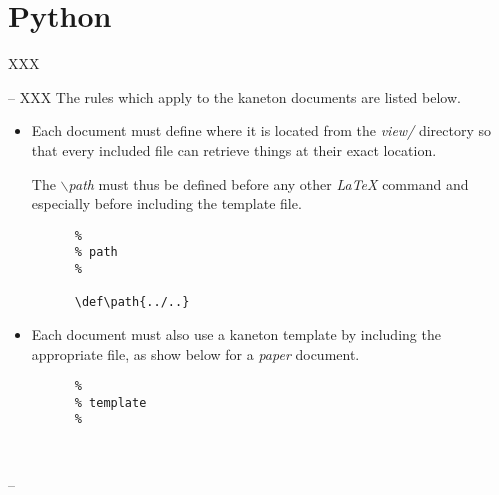 %
%
%
%
%
%

%
%

\section{Python}

XXX

-- XXX
The rules which apply to the kaneton documents are listed below.

\begin{itemize}
  \item
    Each document must define where it is located from the \textit{view/}
    directory so that every included file can retrieve things at their exact
    location.

    The \textit{$\backslash$path} must thus be defined before any other
    \textit{\LaTeX} command and especially before including the template
    file.

    \begin{verbatim}
      %
      % path
      %

      \def\path{../..}
    \end{verbatim}
  \item
    Each document must also use a kaneton template by including the
    appropriate file, as show below for a \textit{paper} document.

    \begin{verbatim}
      %
      % template
      %

      
    \end{verbatim}
\end{itemize}
--
